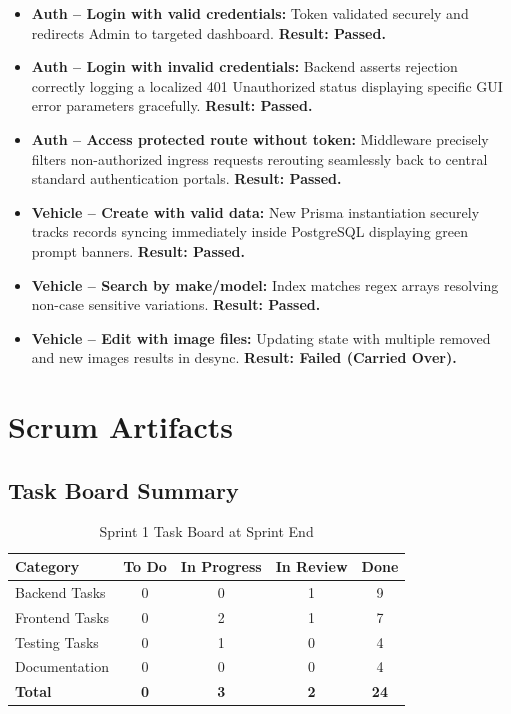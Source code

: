 \documentclass[12pt,a4paper]{article}
\newcommand{\thead}[1]{\textbf{\color{white}#1}}
\begin{document}
\begin{itemize}[leftmargin=1.5em, itemsep=4pt]
  \item \textbf{Auth -- Login with valid credentials:} Token validated securely and redirects Admin to targeted dashboard. \textbf{Result: Passed.}
  \item \textbf{Auth -- Login with invalid credentials:} Backend asserts rejection correctly logging a localized 401 Unauthorized status displaying specific GUI error parameters gracefully. \textbf{Result: Passed.}
  \item \textbf{Auth -- Access protected route without token:} Middleware precisely filters non-authorized ingress requests rerouting seamlessly back to central standard authentication portals. \textbf{Result: Passed.}
  \item \textbf{Vehicle -- Create with valid data:} New Prisma instantiation securely tracks records syncing immediately inside PostgreSQL displaying green prompt banners. \textbf{Result: Passed.}
  \item \textbf{Vehicle -- Search by make/model:} Index matches regex arrays resolving non-case sensitive variations. \textbf{Result: Passed.}
  \item \textbf{Vehicle -- Edit with image files:} Updating state with multiple removed and new images results in desync. \textbf{Result: Failed (Carried Over).}
\end{itemize}

\section{Scrum Artifacts}

\subsection{Task Board Summary}

\begin{table}[H]
\centering
\renewcommand{\arraystretch}{1.3}
\begin{tabularx}{\textwidth}{|Y|c|c|c|c|}
\hline
{} \thead{Category} & \thead{To Do} & \thead{In Progress} & \thead{In Review} & \thead{Done} \\
\hline
Backend Tasks   & 0 & 0 & 1 & 9 \\
\hline
{}
Frontend Tasks  & 0 & 2 & 1 & 7 \\
\hline
Testing Tasks   & 0 & 1 & 0 & 4 \\
\hline
{}
Documentation   & 0 & 0 & 0 & 4 \\
\hline
\textbf{Total}  & \textbf{0} & \textbf{3} & \textbf{2} & \textbf{24} \\
\hline
\end{tabularx}
\caption{Sprint 1 Task Board at Sprint End}
\end{table}
\end{document}
